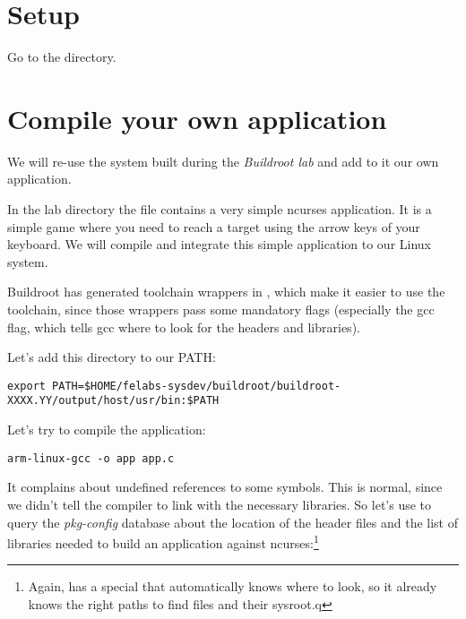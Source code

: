 
\section{Setup}

Go to the  directory.

\section{Compile your own application}

We will re-use the system built during the {\em Buildroot lab} and add
to it our own application.

In the lab directory the file  contains a very simple
ncurses application. It is a simple game where you need to reach a
target using the arrow keys of your keyboard.  We will compile and
integrate this simple application to our Linux system.

Buildroot has generated toolchain wrappers in
, which make it easier to use the toolchain,
since those wrappers pass some mandatory flags (especially the
 gcc flag, which tells gcc where to look for the
headers and libraries).

Let's add this directory to our PATH:

\footnotesize
\begin{verbatim}
export PATH=$HOME/felabs-sysdev/buildroot/buildroot-XXXX.YY/output/host/usr/bin:$PATH
\end{verbatim}
\normalsize

Let's try to compile the application:

\begin{verbatim}
arm-linux-gcc -o app app.c
\end{verbatim}

It complains about undefined references to some symbols. This is
normal, since we didn't tell the compiler to link with the necessary
libraries. So let's use  to query the {\em
pkg-config} database about the location of the header files and the
list of libraries needed to build an application against
ncurses:\footnote{Again,  has a special
 that automatically knows where to look, so it
already knows the right paths to find  files and their
sysroot.q}

